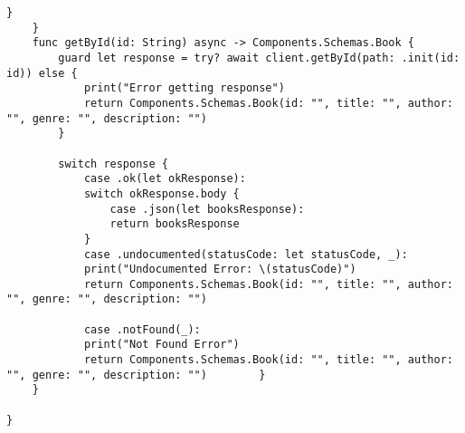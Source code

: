 \begin{lstlisting}[caption=ApiService file]
        }
    }
    func getById(id: String) async -> Components.Schemas.Book {
        guard let response = try? await client.getById(path: .init(id: id)) else {
            print("Error getting response")
            return Components.Schemas.Book(id: "", title: "", author: "", genre: "", description: "")
        }
        
        switch response {
            case .ok(let okResponse):
            switch okResponse.body {
                case .json(let booksResponse):
                return booksResponse
            }
            case .undocumented(statusCode: let statusCode, _):
            print("Undocumented Error: \(statusCode)")
            return Components.Schemas.Book(id: "", title: "", author: "", genre: "", description: "")
            
            case .notFound(_):
            print("Not Found Error")
            return Components.Schemas.Book(id: "", title: "", author: "", genre: "", description: "")        }
    }
    
}

\end{lstlisting}